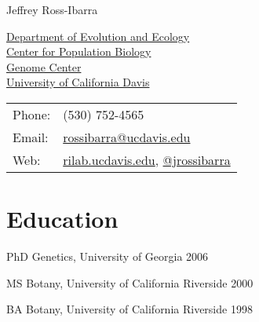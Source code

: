 \documentclass[letterpaper,10pt]{article}
\def\name{Jeffrey Ross-Ibarra}
\renewenvironment{itemize}{
  \begin{list}{}{
    \setlength{\leftmargin}{1.5em}
  }
}{
  \end{list}
}
\begin{document}
{\huge \name}


\vspace{0.25in}

\begin{minipage}{0.55\linewidth}
  \href{http://eve.ucdavis.edu}{Department of Evolution and Ecology}\\
  \href{http://cpb.ucdavis.edu/}{Center for Population Biology}\\
  \href{http://www.genomecenter.ucdavis.edu/}{Genome Center}\\
  \href{http://www.ucdavis.edu/}{University of California Davis} \\
\end{minipage}
\begin{minipage}{0.35\linewidth}
  \begin{tabular}{ll}
    Phone: & (530) 752-4565 \\
    Email: & \href{mailto:rossibarra@ucdavis.edu}{rossibarra@ucdavis.edu} \\
    Web: & \href{http://rilab.ucdavis.edu/}{rilab.ucdavis.edu}, \href{http://www.twitter.com/jrossibarra/}{@jrossibarra} \\
  \end{tabular}
\end{minipage}

\section*{Education}
\begin{itemize}
\setlength\itemsep{0ex}
 \item PhD Genetics, University of Georgia 2006
  \item MS Botany, University of California Riverside 2000
 \item BA Botany, University of California Riverside 1998
\end{itemize}

\end{document}
